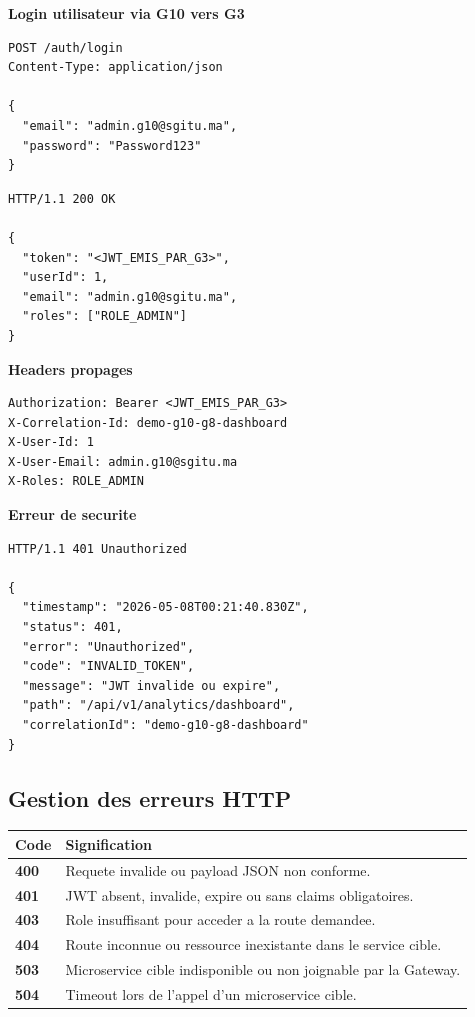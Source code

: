 \documentclass[12pt, a4paper]{article}
\begin{document}
\textbf{Login utilisateur via G10 vers G3}

\begin{lstlisting}[style=codeStyle]
POST /auth/login
Content-Type: application/json

{
  "email": "admin.g10@sgitu.ma",
  "password": "Password123"
}
\end{lstlisting}

\begin{lstlisting}[style=codeStyle]
HTTP/1.1 200 OK

{
  "token": "<JWT_EMIS_PAR_G3>",
  "userId": 1,
  "email": "admin.g10@sgitu.ma",
  "roles": ["ROLE_ADMIN"]
}
\end{lstlisting}

\textbf{Headers propages}

\begin{lstlisting}[style=codeStyle]
Authorization: Bearer <JWT_EMIS_PAR_G3>
X-Correlation-Id: demo-g10-g8-dashboard
X-User-Id: 1
X-User-Email: admin.g10@sgitu.ma
X-Roles: ROLE_ADMIN
\end{lstlisting}

\textbf{Erreur de securite}

\begin{lstlisting}[style=codeStyle]
HTTP/1.1 401 Unauthorized

{
  "timestamp": "2026-05-08T00:21:40.830Z",
  "status": 401,
  "error": "Unauthorized",
  "code": "INVALID_TOKEN",
  "message": "JWT invalide ou expire",
  "path": "/api/v1/analytics/dashboard",
  "correlationId": "demo-g10-g8-dashboard"
}
\end{lstlisting}

\subsection{Gestion des erreurs HTTP}

\begin{center}
\begin{tabular}{>{\bfseries}p{2.2cm} p{10.2cm}}
\rowcolor{navyblue}
\color{white}\textbf{Code} & \color{white}\textbf{Signification} \\
\hline
400 & Requete invalide ou payload JSON non conforme. \\
\rowcolor{lightgray}
401 & JWT absent, invalide, expire ou sans claims obligatoires. \\
403 & Role insuffisant pour acceder a la route demandee. \\
\rowcolor{lightgray}
404 & Route inconnue ou ressource inexistante dans le service cible. \\
503 & Microservice cible indisponible ou non joignable par la Gateway. \\
\rowcolor{lightgray}
504 & Timeout lors de l'appel d'un microservice cible. \\
\end{tabular}
\end{center}
\end{document}
